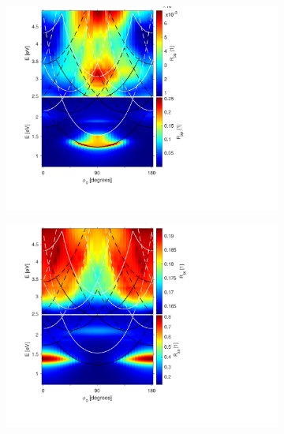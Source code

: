 \begin{figure}[h]  %
    \begin{subfigure}{0.5\textwidth}
        \centering
        \includegraphics[width=\linewidth, trim=1.2cm  1.8cm 6.5cm 0.3cm, clip]{figures/ch4/S5B/contour/S5B_Rpp.pdf}
        \caption{}
        \label{fig:S5B_contour_Rpp}
    \end{subfigure}
    \begin{subfigure}{0.5\textwidth}
        \centering
        \includegraphics[width=\linewidth, trim=1.2cm  1.8cm 6.5cm 0.3cm, clip]{figures/ch4/S5B/contour/S5B_Rss.pdf}
        \caption{}
        \label{fig:S5B_contour_Rss}
    \end{subfigure}
    

\end{figure}
